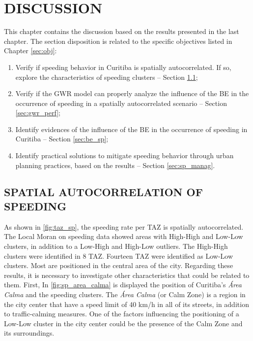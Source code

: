 \chapter{DISCUSSION} \label{chap:discussion}

This chapter contains the discussion based on the results presented in the last chapter. The section disposition is related to the specific objectives listed in Chapter \ref{sec:obj}:

\begin{enumerate}
    \item Verify if speeding behavior in Curitiba is spatially autocorrelated. If so, explore the characteristics of speeding clusters – Section \ref{sec:sp_corr};
    \item Verify if the GWR model can properly analyze the influence of the BE in the occurrence of speeding in a spatially autocorrelated scenario – Section \ref{sec:gwr_perf};
    \item Identify evidences of the influence of the BE in the occurrence of speeding in Curitiba – Section \ref{sec:be_sp};
    \item Identify practical solutions to mitigate speeding behavior through urban planning practices, based on the results – Section \ref{sec:sp_manag}.
\end{enumerate}

\section{SPATIAL AUTOCORRELATION OF SPEEDING} \label{sec:sp_corr}



As shown in \autoref{fig:taz_sp}, the speeding rate per TAZ is spatially autocorrelated. The Local Moran on speeding data showed areas with High-High and Low-Low clusters, in addition to a Low-High and High-Low outliers. The High-High clusters were identified in 8 TAZ. Fourteen TAZ were identified as Low-Low clusters. Most are positioned in the central area of the city. Regarding these results, it is necessary to investigate other characteristics that could be related to them. First, In \autoref{fig:sp_area_calma} is displayed the position of Curitiba's \textit{Área Calma} and the speeding clusters. The \textit{Área Calma} (or Calm Zone) is a region in the city center that have a speed limit of 40 km/h in all of its streets, in addition to traffic-calming measures. One of the factors influencing the positioning of a Low-Low cluster in the city center could be the presence of the Calm Zone and its surroundings. 

